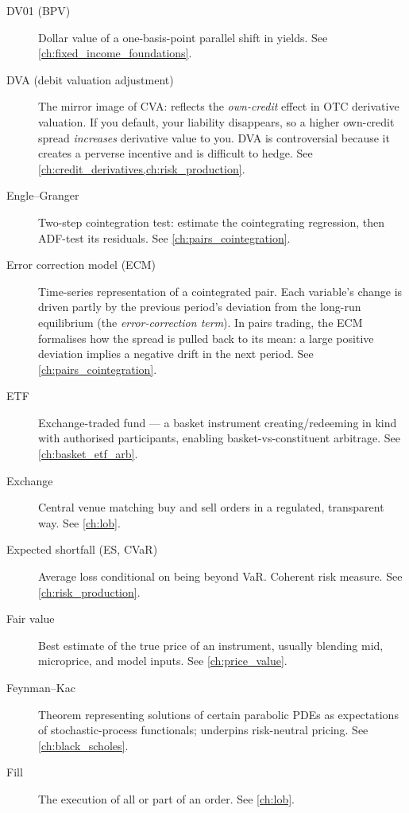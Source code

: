 \begin{description}
\item[DV01 (BPV)]
Dollar value of a one-basis-point parallel shift in yields. See \cref{ch:fixed_income_foundations}.

\item[DVA (debit valuation adjustment)]
The mirror image of CVA: reflects the \emph{own-credit} effect in
OTC derivative valuation. If you default, your liability disappears,
so a higher own-credit spread \emph{increases} derivative value to you.
DVA is controversial because it creates a perverse incentive and is
difficult to hedge. See \cref{ch:credit_derivatives,ch:risk_production}.

\item[Engle--Granger]
Two-step cointegration test: estimate the cointegrating regression,
then ADF-test its residuals. See \cref{ch:pairs_cointegration}.

\item[Error correction model (ECM)]
Time-series representation of a cointegrated pair. Each variable's
change is driven partly by the previous period's deviation from the
long-run equilibrium (the \emph{error-correction term}). In pairs
trading, the ECM formalises how the spread is pulled back to its mean:
a large positive deviation implies a negative drift in the next period.
See \cref{ch:pairs_cointegration}.

\item[ETF]
Exchange-traded fund --- a basket instrument creating/redeeming in kind
with authorised participants, enabling basket-vs-constituent arbitrage.
See \cref{ch:basket_etf_arb}.

\item[Exchange]
Central venue matching buy and sell orders in a regulated, transparent
way. See \cref{ch:lob}.

\item[Expected shortfall (ES, CVaR)]
Average loss conditional on being beyond VaR. Coherent risk measure. See \cref{ch:risk_production}.

\item[Fair value]
Best estimate of the true price of an instrument, usually blending
mid, microprice, and model inputs. See \cref{ch:price_value}.

\item[Feynman--Kac]
Theorem representing solutions of certain parabolic PDEs as expectations
of stochastic-process functionals; underpins risk-neutral pricing. See \cref{ch:black_scholes}.

\item[Fill]
The execution of all or part of an order. See \cref{ch:lob}.


\end{description}

